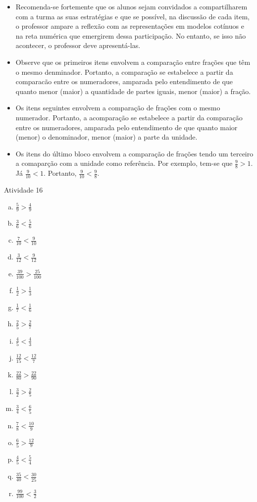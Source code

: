 \documentclass[oneside]{book}
\begin{document}
\begin{multicols}{2}
\begin{itemize}
   \item Recomenda-se fortemente que os alunos sejam convidados a compartilharem com a turma as suas estratégias e que se possível, na discussão de cada item, o professor ampare a reflexão com as representações em modelos cotínuos e na reta numérica que emergirem dessa participação. No entanto, se isso não acontecer, o professor deve apresentá-las.  
   \item Observe que os primeiros itens envolvem a comparação entre frações que têm o mesmo denminador. Portanto, a comparação se estabelece a partir da comparacão entre os numeradores, amparada pelo entendimento de que quanto menor (maior) a quantidade de partes iguais, menor (maior) a fração.
   \item Os itens seguintes envolvem a comparação de frações com o mesmo numerador. Portanto, a acomparação se estabelece a partir da comparação entre os numeradores, amparada pelo entendimento de que quanto maior (menor) o denominador, menor (maior) a parte da unidade.
   \item Os itens do último bloco envolvem a comparação de frações tendo um terceiro a comaparção com a unidade como referência. Por exemplo, tem-se que $\frac{9}{8} > 1$. Já $\frac{9}{10} < 1$. Portanto, $\frac{9}{10}<\frac{9}{8}$.
\end{itemize}

\begin{resposta*}{Atividade 16}
\begin{enumerate}[a)]
 \item $\frac{5}{9} > \frac{4}{9}$ 
 \item $\frac{3}{6} < \frac{5}{6}$
\item   $\frac{7}{10} < \frac{9}{10}$    
\item  $\frac{3}{12} < \frac{9}{12}$    
\item $\frac{39}{100} > \frac{25}{100}$ 

\item   $\frac{1}{2} > \frac{1}{3}$     
\item  $\frac{1}{7} < \frac{1}{6}$     
\item   $\frac{2}{5} > \frac{2}{7}$    
\item   $\frac{4}{5} < \frac{4}{3}$    
\item   $\frac{12}{15} < \frac{12}{7}$ 
\item   $\frac{22}{80} > \frac{22}{90}$

\item   $\frac{3}{2} > \frac{2}{5}$    
\item   $\frac{3}{4} < \frac{6}{5}$    
\item   $\frac{7}{8} < \frac{10}{9}$   
\item   $\frac{6}{5} > \frac{12}{9}$   
\item  $\frac{4}{5}< \frac{5}{4}$     
\item  $\frac{35}{40}< \frac{30}{25}$ 
\item  $\frac{99}{100}<\frac{3}{2}$   
\end{enumerate}
\end{resposta*}



\end{multicols}
\end{document}
